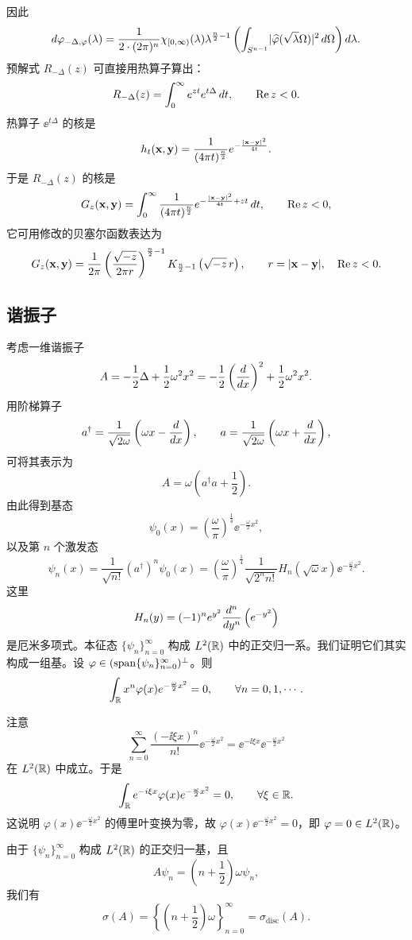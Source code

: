 因此
\[
d\varphi_{-\Delta,\varphi}(\lambda)
=\frac{1}{2\cdot(2\pi)^n}\chi_{[0,\infty)}(\lambda)\lambda^{\frac n2-1}
\left(\int_{S^{n-1}}\lvert \widehat{\varphi}(\sqrt{\lambda}\Omega)\rvert^2\,d\Omega\right)d\lambda.
\]
预解式 $R_{-\Delta}(z)$ 可直接用热算子算出：
\[
R_{-\Delta}(z)=\int_0^\infty e^{zt}e^{t\Delta}\,d t,\qquad \operatorname{Re} z<0.
\]
热算子 $\ee^{t\Delta}$ 的核是
\[
h_t(\mathbf{x},\mathbf{y})=\frac{1}{(4\pi t)^{\frac n2}}e^{-\frac{\lvert \mathbf{x}-\mathbf{y}\rvert^2}{4t}}.
\]
于是 $R_{-\Delta}(z)$ 的核是
\[
G_z(\mathbf{x},\mathbf{y})=\int_0^\infty\frac{1}{(4\pi t)^{\frac n2}}
e^{-\frac{\lvert \mathbf{x}-\mathbf{y}\rvert^2}{4t}+zt}\,d t,\qquad \operatorname{Re} z<0,
\]
它可用修改的贝塞尔函数表达为
\[
G_z(\mathbf{x},\mathbf{y})
=\frac{1}{2\pi}\left(\frac{\sqrt{-z}}{2\pi r}\right)^{\frac n2-1}
K_{\frac n2-1}\left(\sqrt{-z}\,r\right),
\qquad r=\lvert \mathbf{x}-\mathbf{y}\rvert,\quad \operatorname{Re} z<0.
\]

\subsection{谐振子}

考虑一维谐振子
\[
A=-\frac12\Delta+\frac12\omega^2x^2
=-\frac12\left(\frac{d}{d x}\right)^2+\frac12\omega^2x^2.
\]
用阶梯算子
\[
a^\dagger=\frac{1}{\sqrt{2\omega}}\left(\omega x-\frac{d}{d x}\right),
\qquad
a=\frac{1}{\sqrt{2\omega}}\left(\omega x+\frac{d}{d x}\right),
\]
可将其表示为
\[
A=\omega\left(a^\dagger a+\frac12\right).
\]
由此得到基态
\[
\psi_0(x)=\left(\frac{\omega}{\pi}\right)^{\frac14}\ee^{-\frac{\omega}{2}x^2},
\]
以及第 $n$ 个激发态
\[
\psi_n(x)=\frac{1}{\sqrt{n!}}(a^\dagger)^n\psi_0(x)
=\left(\frac{\omega}{\pi}\right)^{\frac14}\frac{1}{\sqrt{2^nn!}}H_n(\sqrt{\omega}x)\ee^{-\frac{\omega}{2}x^2}.
\]
这里
\[
H_n(y)=(-1)^ne^{y^2}\frac{d^n}{d y^n}\left(e^{-y^2}\right)
\]
是厄米多项式。本征态 $\{\psi_n\}_{n=0}^\infty$ 构成 $L^2(\mathbb{R})$ 中的正交归一系。我们证明它们其实构成一组基。设 $\varphi\in(\operatorname{span}\{\psi_n\}_{n=0}^\infty)^\perp$。则
\[
\int_{\mathbb{R}} x^n\varphi(x)e^{-\frac{\omega}{2}x^2}=0,\qquad\forall n=0,1,\cdots.
\]

注意
\[
\sum_{n=0}^\infty\frac{(-\ii\xi x)^n}{n!}\ee^{-\frac{\omega}{2}x^2}
=\ee^{-\ii\xi x}\ee^{-\frac{\omega}{2}x^2}
\]
在 $L^2(\mathbb{R})$ 中成立。于是
\[
\int_{\mathbb{R}}e^{-i\xi x}\varphi(x)e^{-\frac{\omega}{2}x^2}=0,\qquad\forall\xi\in\mathbb{R}.
\]
这说明 $\varphi(x)\ee^{-\frac{\omega}{2}x^2}$ 的傅里叶变换为零，故 $\varphi(x)\ee^{-\frac{\omega}{2}x^2}=0$，即 $\varphi=0\in L^2(\mathbb{R})$。

由于 $\{\psi_n\}_{n=0}^\infty$ 构成 $L^2(\mathbb{R})$ 的正交归一基，且
\[
A\psi_n=\left(n+\frac12\right)\omega\psi_n,
\]
我们有
\[
\sigma(A)=\left\{\left(n+\frac12\right)\omega\right\}_{n=0}^\infty=\sigma_{\mathrm{disc}}(A).
\]

